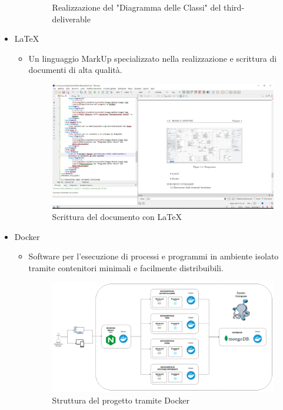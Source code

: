 \documentclass{report}
\begin{document}
\begin{itemize}
\begin{itemize}
\begin{figure}[H]
			\caption{Realizzazione del "Diagramma delle Classi" del third-deliverable}
		\end{figure}	
	\end{itemize}
	\item LaTeX
	\begin{itemize}
		\item Un linguaggio MarkUp specializzato nella realizzazione e scrittura di documenti di alta qualità.
		\begin{figure}[H]
			\centering
			\includegraphics[width=1\textwidth]{images/latex-image.jpg}
			\caption{Scrittura del documento con LaTeX}
		\end{figure}	
	\end{itemize}
	
	\item Docker
	\begin{itemize}
		\item Software per l'esecuzione di processi e programmi in ambiente isolato tramite contenitori minimali e facilmente distribuibili.
		\begin{figure}[H]
			\centering
			\includegraphics[width=1\textwidth]{images/diagramma_microservizi.png}
			\caption{Struttura del progetto tramite Docker}
		\end{figure}	
	\end{itemize}
	
\end{itemize}
\end{document}
